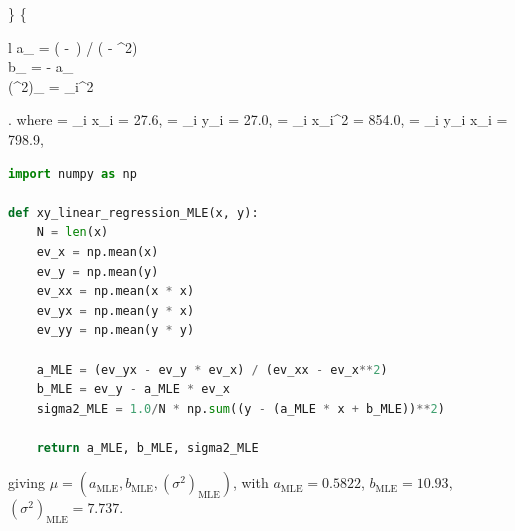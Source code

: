\begin{itemize}
			\right\}
			\Rightarrow
			\left\{
				\begin{array}{l}
				a_ = \big( - \,\big) / \big( - ^2\big)
				\\
				b_ =  - a_\,
				\\
				(\sigma^2)_ = \sum_i^2
				\end{array}
			\right.
		\ee
		where
		\be
			 = \sum_i x_i = 27.6,\qquad 
			 = \sum_i y_i = 27.0,\qquad
			 = \sum_i x_i^2 = 854.0,\qquad
			 = \sum_i y_i x_i = 798.9,\qquad
		\ee
\begin{lstlisting}[language=python]
import numpy as np

def xy_linear_regression_MLE(x, y):
    N = len(x)
    ev_x = np.mean(x)
    ev_y = np.mean(y)
    ev_xx = np.mean(x * x)
    ev_yx = np.mean(y * x)
    ev_yy = np.mean(y * y)

    a_MLE = (ev_yx - ev_y * ev_x) / (ev_xx - ev_x**2)
    b_MLE = ev_y - a_MLE * ev_x
    sigma2_MLE = 1.0/N * np.sum((y - (a_MLE * x + b_MLE))**2)
    
    return a_MLE, b_MLE, sigma2_MLE
\end{lstlisting}
		giving $\mu = (a_\text{MLE}, b_\text{MLE}, (\sigma^2)_\text{MLE})$, with $a_\text{MLE} = 0.5822$, \quad $b_\text{MLE} = 10.93$, \quad  $(\sigma^2)_\text{MLE} = 7.737$.


\end{itemize}

